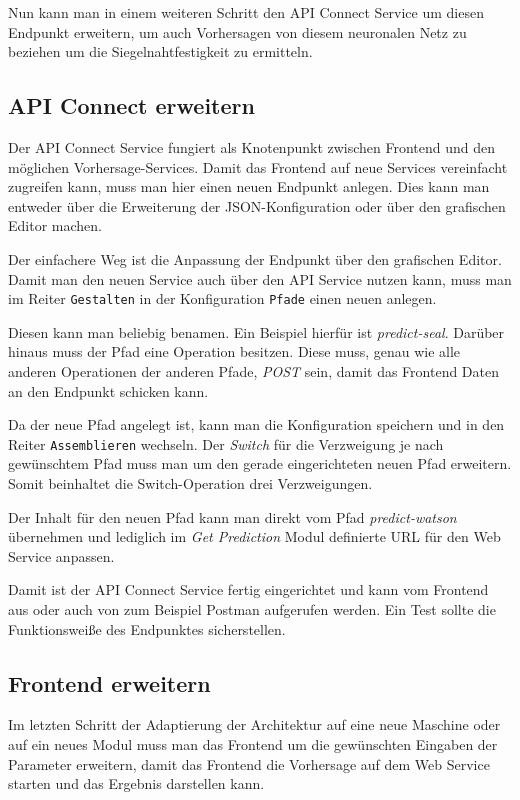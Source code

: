Nun kann man in einem weiteren Schritt den API Connect Service um diesen Endpunkt erweitern, um auch Vorhersagen von
diesem neuronalen Netz zu beziehen um die Siegelnahtfestigkeit zu ermitteln.

\subsection{API Connect erweitern}
Der API Connect Service fungiert als Knotenpunkt zwischen Frontend und den möglichen Vorhersage-Services. Damit das
Frontend auf neue Services vereinfacht zugreifen kann, muss man hier einen neuen Endpunkt anlegen. Dies kann man
entweder über die Erweiterung der JSON-Konfiguration oder über den grafischen Editor machen.

Der einfachere Weg ist die Anpassung der Endpunkt über den grafischen Editor. Damit man den neuen Service auch über den
API Service nutzen kann, muss man im Reiter \texttt{Gestalten} in der Konfiguration \texttt{Pfade} einen neuen anlegen.

Diesen kann man beliebig benamen. Ein Beispiel hierfür ist \textit{predict-seal}. Darüber hinaus muss der Pfad eine
Operation besitzen. Diese muss, genau wie alle anderen Operationen der anderen Pfade, \textit{POST} sein, damit das
Frontend Daten an den Endpunkt schicken kann.

Da der neue Pfad angelegt ist, kann man die Konfiguration speichern und in den Reiter \texttt{Assemblieren} wechseln.
Der \textit{Switch} für die Verzweigung je nach gewünschtem Pfad muss man um den gerade eingerichteten neuen Pfad
erweitern. Somit beinhaltet die Switch-Operation drei Verzweigungen.

Der Inhalt für den neuen Pfad kann man direkt vom Pfad \textit{predict-watson} übernehmen und lediglich im
\textit{Get Prediction} Modul definierte URL für den Web Service anpassen.

Damit ist der API Connect Service fertig eingerichtet und kann vom Frontend aus oder auch von zum Beispiel Postman
aufgerufen werden. Ein Test sollte die Funktionsweiße des Endpunktes sicherstellen.

\subsection{Frontend erweitern}
Im letzten Schritt der Adaptierung der Architektur auf eine neue Maschine oder auf ein neues Modul muss man das Frontend
um die gewünschten Eingaben der Parameter erweitern, damit das Frontend die Vorhersage auf dem Web Service starten und
das Ergebnis darstellen kann.

